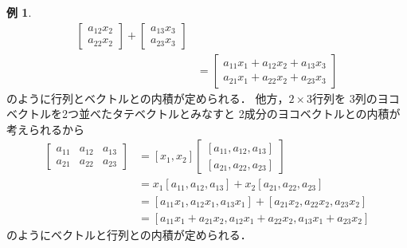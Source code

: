 \documentclass[11pt, a4paper, dvipdfmx]{jsarticle}
\theoremstyle{definition}
\newtheorem{Example}[Axiom]{例}
\theoremstyle{mystyle}
\numberwithin{equation}{section} %
\begin{document}
\begin{Example}
\begin{align*}
\begin{bmatrix}
                a_{12}x_2\\a_{22}x_2 
        \end{bmatrix}+\begin{bmatrix}
                a_{13}x_3\\a_{23}x_3
        \end{bmatrix}\\
        &=\begin{bmatrix}
            a_{11}x_1+a_{12}x_2+a_{13}x_3\\
            a_{21}x_1+a_{22}x_2+a_{23}x_3
        \end{bmatrix}
    \end{align*}
    のように行列とベクトルとの内積が定められる．
    他方，$2\times3$行列を
    3列のヨコベクトルを2つ並べたタテベクトルとみなすと
    2成分のヨコベクトルとの内積が考えられるから
    \begin{align*}
        [x_1,x_2]\begin{bmatrix}
            a_{11}&a_{12}&a_{13}\\
            a_{21}&a_{22}&a_{23}
        \end{bmatrix}
        &=[x_1,x_2]\begin{bmatrix}
            [a_{11},a_{12},a_{13}]\\
            [a_{21},a_{22},a_{23}]
        \end{bmatrix}\\
        &=x_1[a_{11},a_{12},a_{13}]+x_2[a_{21},a_{22},a_{23}]\\
        &=[a_{11}x_1,a_{12}x_1,a_{13}x_1]+[a_{21}x_2,a_{22}x_2,a_{23}x_2]\\
        &=[a_{11}x_1+a_{21}x_2,a_{12}x_1+a_{22}x_2,a_{13}x_1+a_{23}x_2]
    \end{align*}
    のようにベクトルと行列との内積が定められる．
\end{Example}
\end{document}
